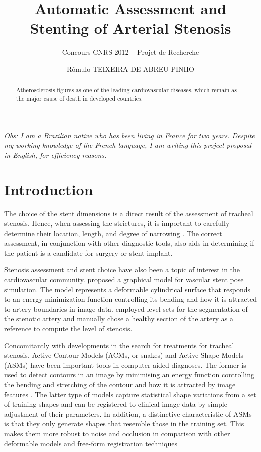 \documentclass[a4paper]{article}
\title{Automatic Assessment and Stenting of Arterial Stenosis}
\author{Concours CNRS 2012 -- Projet de Recherche}
\date{R\^omulo TEIXEIRA DE ABREU PINHO}
\begin{document}
\maketitle

\begin{noindent}
{\em Obs: I am a Brazilian native who has been living in France for two years. Despite my working knowledge of the French language, I am writing this project proposal in English, for efficiency reasons.}
\end{noindent}

\begin{abstract}
Atherosclerosis figures as one of the leading cardiovascular diseases, which remain as the major cause of death in developed countries. 
\end{abstract}

\tableofcontents

\section{Introduction}

The choice of the stent dimensions is a direct result of the assessment of tracheal stenosis. Hence, when assessing the strictures, it is important to carefully determine their location, length, and degree of narrowing \citep{Boiselle}. The correct assessment, in conjunction with other diagnostic
tools, also aids in determining if the patient is a candidate for surgery or stent implant.

Stenosis assessment and stent choice have also been a topic of interest in the cardiovascular community. \citet{Florez} proposed a graphical model for vascular stent pose simulation. The model represents a deformable cylindrical surface that responds to an energy minimization function controlling its bending and how it is attracted to artery boundaries in image data. \citet{Bemmel} employed level-sets for the segmentation of the stenotic artery and manually chose a healthy section
of the artery as a reference to compute the level of stenosis.

Concomitantly with developments in the search for treatments for tracheal stenosis, Active Contour Models (ACMs, or snakes) and Active Shape Models (ASMs) have been important tools in computer aided diagnoses. The former is used to detect contours in an image by minimising an energy function controlling the bending and stretching of the contour and how it is attracted by image features \citep{Kass}. The latter type of models capture statistical shape variations from a set of training shapes and can be registered to clinical image data by simple adjustment of their parameters.
In addition, a distinctive characteristic of ASMs is that they only generate shapes that resemble those in the training set. This makes them more robust to noise and occlusion in comparison with other deformable models and free-form registration techniques \citep{Cootes}
\end{document}
